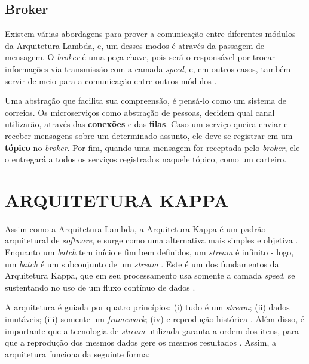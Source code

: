 \subsection{Broker}

Existem várias abordagens para prover a comunicação entre diferentes módulos da
Arquitetura Lambda, e, um desses modos é através da passagem de mensagem. O
\textit{broker} é uma peça chave, pois será o responsável por trocar informações
via transmissão com a camada \textit{speed}, e, em outros casos, também servir
de meio para a comunicação entre outros módulos \cite{marz2015}.

Uma abstração que facilita sua compreensão, é pensá-lo como um sistema de
correios. Os microserviços como abstração de pessoas, decidem qual canal
utilizarão, através das \textbf{conexões} e das \textbf{filas}. Caso um serviço
queira enviar e receber mensagens sobre um determinado assunto, ele deve se
registrar em um \textbf{tópico} no \textit{broker}. Por fim, quando uma
mensagem for receptada pelo \textit{broker}, ele o entregará a todos os
serviços registrados naquele tópico, como um carteiro.

\section{ARQUITETURA KAPPA}

Assim como a Arquitetura Lambda, a Arquitetura Kappa é um padrão arquitetural
de \textit{software}, e surge como uma alternativa mais simples e objetiva
\cite{kreps2014}. Enquanto um \textit{batch} tem início e fim bem definidos,
um \textit{stream} é infinito - logo, um \textit{batch} é um subconjunto de
um \textit{stream} \cite{seyvet2016}. Este é um dos fundamentos da Arquitetura
Kappa, que em seu processamento usa somente a camada \textit{speed}, se
sustentando no uso de um fluxo contínuo de dados \cite{kreps2014}.

A arquitetura é guiada por quatro princípios: (i) tudo é um \textit{stream};
(ii) dados imutáveis; (iii) somente um \textit{framework};
(iv) e reprodução histórica \cite{seyvet2016}. Além disso, é importante que
a tecnologia de \textit{stream} utilizada garanta a ordem dos itens, para
que a reprodução dos mesmos dados gere os mesmos resultados \cite{seyvet2016}.
Assim, a arquitetura funciona da seguinte forma:

